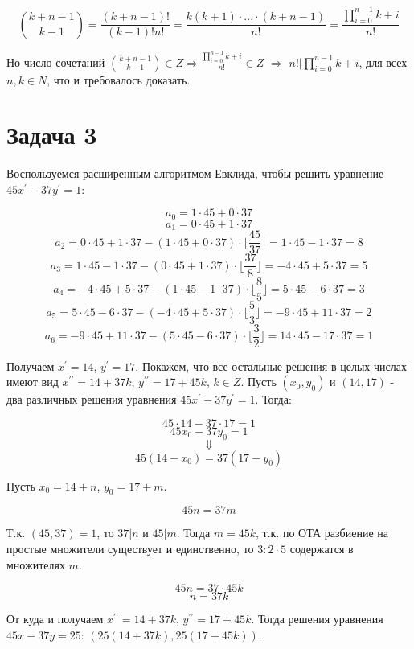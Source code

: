 \documentclass{article}
\begin{document}
	 $${k + n - 1 \choose k - 1} = \frac{(k + n - 1)!}{(k - 1)!n!} = \frac{k(k + 1) \cdot ... \cdot (k + n - 1)}{n!} = \frac{\prod_{i=0}^{n - 1} k + i}{n!}$$
	 
	 Но число сочетаний ${k + n - 1 \choose k - 1} \in Z \Rightarrow \frac{\prod_{i=0}^{n - 1} k + i}{n!} \in Z$	
	 $\Rightarrow $ $n! | \prod_{i=0}^{n - 1} k + i$, для всех $n, k \in N$, что и требовалось доказать.
	
	\section{Задача 3}
		Воспользуемся расширенным алгоритмом Евклида, чтобы решить уравнение $45x^\prime - 37y^\prime = 1$:
		
		$$ a_0 = 1 \cdot 45 + 0 \cdot 37 $$ 
		$$ a_1 = 0 \cdot 45 + 1 \cdot 37 $$ 
		$$ a_2 = 0 \cdot 45 + 1 \cdot 37 - (1 \cdot 45 + 0 \cdot 37) \cdot \lfloor\frac{45} {37}\rfloor = 1 \cdot 45 - 1 \cdot 37 = 8 $$
		$$ a_3 = 1 \cdot 45 - 1 \cdot 37 - (0 \cdot 45 + 1 \cdot 37) \cdot \lfloor\frac{37} {8}\rfloor = -4 \cdot 45 + 5 \cdot 37 = 5 $$
		$$ a_4 = -4 \cdot 45 + 5 \cdot 37 - (1 \cdot 45 - 1 \cdot 37) \cdot \lfloor\frac{8} {5}\rfloor = 5 \cdot 45 - 6 \cdot 37 = 3 $$
		$$ a_5 = 5 \cdot 45 - 6 \cdot 37 - (-4 \cdot 45 + 5 \cdot 37) \cdot \lfloor\frac{5} {3}\rfloor = -9 \cdot 45 + 11 \cdot 37 = 2 $$
		$$ a_6 = -9 \cdot 45 + 11 \cdot 37 - (5 \cdot 45 - 6 \cdot 37) \cdot \lfloor\frac{3} {2}\rfloor = 14 \cdot 45 - 17 \cdot 37 = 1 $$
		
		Получаем $x^\prime = 14$, $y^\prime = 17$. Покажем, что все остальные решения в целых числах имеют вид $x^{\prime\prime} = 14 + 37k$, $y^{\prime\prime} = 17 + 45k$, $k \in Z$.
		Пусть $(x_0, y_0)$ и $(14, 17)$ - два различных решения уравнения $45x^\prime - 37y^\prime = 1$. Тогда:
		
		$$ 45\cdot 14 - 37\cdot 17 = 1$$ 
		$$ 45x_0 - 37y_0 = 1$$
		$$ \Downarrow $$
		$$ 45 (14 - x_0) = 37 (17 - y_0) $$
		
		Пусть $x_0 = 14 + n$, $y_0 = 17 + m$.
		
		$$ 45 n = 37 m $$
		
		Т.к. $ (45, 37) = 1$, то $37 | n$ и $45 | m$. Тогда $m = 45k$, т.к. по ОТА разбиение на простые множители существует и единственно, то $3:2 \cdot 5$ содержатся в множителях $m$.
		
		$$ 45 n = 37 \cdot 45k$$
		$$ n = 37k$$
		
		От куда и получаем $x^{\prime\prime} = 14 + 37k$, $y^{\prime\prime} = 17 + 45k$.
		Тогда решения уравнения $45x - 37y = 25$: $(25(14 + 37k), 25(17 + 45k))$.
		
\end{document}
